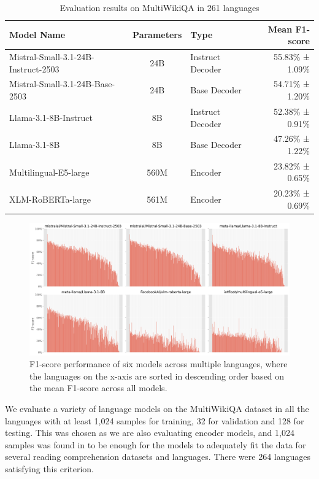\documentclass[10pt, a4paper]{article}
\begin{document}
\begin{table}[h]
    \centering
    \small
    \begin{tabular}{lclr}
        \textbf{Model Name} & \textbf{Parameters} & \textbf{Type} & \textbf{Mean F1-score} \\
        \midrule
        Mistral-Small-3.1-24B-Instruct-2503 \cite{mistralsmall2025} & 24B & Instruct Decoder & 55.83\% ± 1.09\% \\
        Mistral-Small-3.1-24B-Base-2503 \cite{mistralsmall2025} & 24B & Base Decoder & 54.71\% ± 1.20\% \\
        Llama-3.1-8B-Instruct \cite{grattafiori2024llama} & 8B & Instruct Decoder & 52.38\% ± 0.91\% \\
        Llama-3.1-8B \cite{grattafiori2024llama} & 8B & Base Decoder & 47.26\% ± 1.22\% \\
        Multilingual-E5-large \cite{wang2024multilingual} & 560M & Encoder & 23.82\% ± 0.65\% \\
        XLM-RoBERTa-large \cite{ruder2019unsupervised} & 561M & Encoder & 20.23\% ± 0.69\% \\
    \end{tabular}
    \caption{Evaluation results on MultiWikiQA in 261 languages}
    \label{tab:evaluated-models}
\end{table}

\begin{figure}[h]
    \centering
    \includegraphics[width=\textwidth]{evaluation-plot.png}
    \caption{F1-score performance of six models across multiple languages, where the languages on the x-axis are sorted in descending order based on the mean F1-score across all models.}
    \label{fig:evaluation-results}
\end{figure}

We evaluate a variety of language models on the MultiWikiQA dataset in all the languages with at least 1,024 samples for training, 32 for validation and 128 for testing. This was chosen as we are also evaluating encoder models, and 1,024 samples was found in \citet{nielsen-2023-scandeval} to be enough for the models to adequately fit the data for several reading comprehension datasets and languages. There were 264 languages satisfying this criterion.
\end{document}
